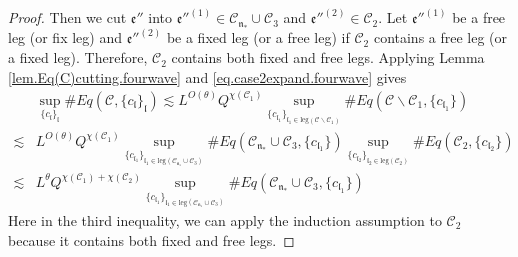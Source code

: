 \begin{proof}
    Then we cut $\mathfrak{e}''$ into $\mathfrak{e}''^{(1)}\in \mathcal{C}_{\mathfrak{n}_*}\cup \mathcal{C}_3$ and $\mathfrak{e}''^{(2)}\in \mathcal{C}_2$. Let $\mathfrak{e}''^{(1)}$ be a free leg (or fix leg) and $\mathfrak{e}''^{(2)}$ be a fixed leg (or a free leg) if $\mathcal{C}_2$ contains a free leg (or a fixed leg). Therefore, $\mathcal{C}_2$ contains both fixed and free legs. Applying Lemma \ref{lem.Eq(C)cutting.fourwave} and \eqref{eq.case2expand.fourwave} gives
    \begin{equation}\label{eq.case2expand'.fourwave}
    \begin{split}
     &\sup_{\{c_{\mathfrak{l}}\}_{\mathfrak{l}}}\#Eq(\mathcal{C},\{c_{\mathfrak{l}}\}_{\mathfrak{l}})
     \lesssim L^{O(\theta)} Q^{\chi(\mathcal{C}_1)}\sup_{\{c_{\mathfrak{l}_1}\}_{\mathfrak{l}_1\in \text{leg}(\mathcal{C}\backslash\mathcal{C}_1)} } \# Eq(\mathcal{C}\backslash\mathcal{C}_1,\{c_{\mathfrak{l}_1}\})
     \\
     \lesssim& L^{O(\theta)} Q^{\chi(\mathcal{C}_1)}\sup_{\{c_{\mathfrak{l}_1}\}_{\mathfrak{l}_1\in \text{leg}(\mathcal{C}_{\mathfrak{n}_*}\cup \mathcal{C}_3)} } \# Eq(\mathcal{C}_{\mathfrak{n}_*}\cup \mathcal{C}_3,\{c_{\mathfrak{l}_1}\}) \sup_{\{c_{\mathfrak{l}_2}\}_{\mathfrak{l}_2\in \text{leg}(\mathcal{C}_2)} }\# Eq(\mathcal{C}_{2}, \{c_{\mathfrak{l}_2}\})
     \\
     \lesssim& L^\theta Q^{\chi(\mathcal{C}_1)+\chi(\mathcal{C}_2)}\sup_{\{c_{\mathfrak{l}_1}\}_{\mathfrak{l}_1\in \text{leg}(\mathcal{C}_{\mathfrak{n}_*}\cup \mathcal{C}_3)} } \# Eq(\mathcal{C}_{\mathfrak{n}_*}\cup \mathcal{C}_3,\{c_{\mathfrak{l}_1}\}) 
    \end{split}
    \end{equation}
    Here in the third inequality, we can apply the induction assumption to $\mathcal{C}_2$ because it contains both fixed and free legs.
    

\end{proof}

